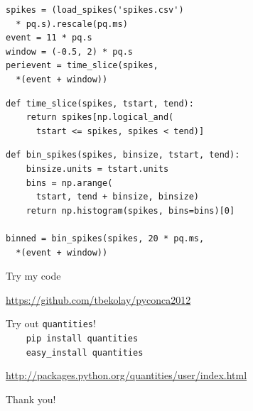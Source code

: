 \documentclass[17pt]{beamer}
\begin{document}
\begin{frame}[fragile]
  \vspace{-12pt}
  \begin{verbatim}
spikes = (load_spikes('spikes.csv')
  * pq.s).rescale(pq.ms)
event = 11 * pq.s
window = (-0.5, 2) * pq.s
perievent = time_slice(spikes,
  *(event + window))
  \end{verbatim}

  \begin{verbatim}
def time_slice(spikes, tstart, tend):
    return spikes[np.logical_and(
      tstart <= spikes, spikes < tend)]
  \end{verbatim}
\end{frame}

\begin{frame}[fragile]
  \vspace{-12pt}
  \begin{small}
    \begin{verbatim}
def bin_spikes(spikes, binsize, tstart, tend):
    binsize.units = tstart.units
    bins = np.arange(
      tstart, tend + binsize, binsize)
    return np.histogram(spikes, bins=bins)[0]

binned = bin_spikes(spikes, 20 * pq.ms,
  *(event + window))
    \end{verbatim}
  \end{small}
\end{frame}

\begin{frame}
   Try my code \\
  \begin{small}
    \url{https://github.com/tbekolay/pyconca2012}
  \end{small}\vspace{1em}

  Try out \texttt{quantities}! \\
  \texttt{~~~~pip install quantities} \\
  \texttt{~~~~easy\_install quantities} \\
  \begin{footnotesize}
    \url{http://packages.python.org/quantities/user/index.html}
  \end{footnotesize}\vspace{1em}

  \begin{large}
    Thank you!
  \end{large}
\end{frame}
\end{document}
